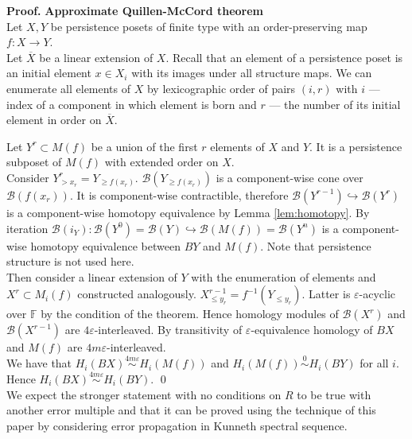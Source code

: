 \documentclass[a4paper, 12pt]{article}
\numberwithin{equation}{section}
\theoremstyle{definition}
\theoremstyle{remark}
\newenvironment{pf}{\noindent\textbf{Proof.}}{\qed}
\renewcommand{\leq}{\leqslant}
\renewcommand{\geq}{\geqslant}
\begin{document}
\begin{pf} \textbf{Approximate Quillen-McCord theorem}\\
  Let $X, Y$ be persistence posets of finite type with an order-preserving map $f : X \to Y$.\\

  Let $\overline{X}$ be a linear extension of $X$. Recall that an element of a persistence poset is an initial element $x \in X_i$ with its images under all structure maps. We can enumerate all elements of $X$ by lexicographic order of pairs $(i,r)$ with $i$ --- index of a component in which element is born and $r$ --- the number of its initial element in order on $\overline{X}$.

  Let $Y^r \subset M(f)$ be a union of the first $r$ elements of $X$ and $Y$. It is a persistence subposet of $M(f)$ with extended order on $X$.\\

  Consider $Y^r_{>x_r} = Y_{\geq f(x_r)}$. $\mathcal{B}(Y_{\geq f(x_r)})$ is a component-wise cone over $\mathcal{B}(f(x_r))$. It is component-wise contractible, therefore $\mathcal{B}(Y^{r-1}) \hookrightarrow \mathcal{B}(Y^{r})$ is a component-wise homotopy equivalence by Lemma \ref{lem:homotopy}. By iteration $\mathcal{B}(i_Y) : \mathcal{B}(Y^{0}) = \mathcal{B}(Y) \hookrightarrow \mathcal{B}(M(f)) = \mathcal{B}(Y^n)$ is a component-wise homotopy equivalence between $BY$ and $M(f)$. Note that persistence structure is not used here.\\

  Then consider a linear extension of $Y$ with the enumeration of elements and $X^r \subset M_i(f)$ constructed analogously. $X^{r-1}_{\leq y_r} = f^{-1}(Y_{\leqslant y_r})$. Latter is $\varepsilon$-acyclic over $\mathbb{F}$ by the condition of the theorem. Hence homology modules of $\mathcal{B}(X^{r})$ and $\mathcal{B}(X^{r-1})$ are $4\varepsilon$-interleaved. By transitivity of $\varepsilon$-equivalence homology of $BX$ and $M(f)$ are $4m\varepsilon$-interleaved.\\

  We have that $H_i(BX) \stackrel{4m\varepsilon}{\sim} H_i(M(f))$ and $H_i(M(f)) \stackrel{0}{\sim} H_i(BY)$ for all $i$. Hence $H_i(BX) \stackrel{4m\varepsilon}{\sim} H_i(BY)$.
\end{pf}\\

We expect the stronger statement with no conditions on $R$ to be true with another error multiple and that it can be proved using the technique of this paper by considering error propagation in Kunneth spectral sequence.
\end{document}
